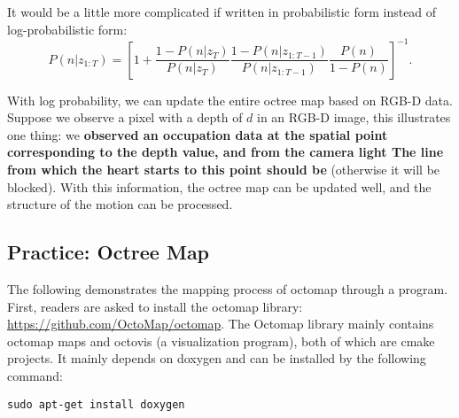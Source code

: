 It would be a little more complicated if written in probabilistic form instead of log-probabilistic form:
\begin{equation}
P (n | z_{1: T})=\left[1+ \frac{1-P (n | z_T)}{P (n | z_T)} \frac{1-P (n | z_{1: T-1})}{P (n | z_{1: T-1})} \frac{P (n)}{1-P (n)} \right] ^{-1}.
\end{equation}

With log probability, we can update the entire octree map based on RGB-D data. Suppose we observe a pixel with a depth of $ d $ in an RGB-D image, this illustrates one thing: we \textbf{observed an occupation data at the spatial point corresponding to the depth value, and from the camera light The line from which the heart starts to this point should be} (otherwise it will be blocked). With this information, the octree map can be updated well, and the structure of the motion can be processed.

\subsection{Practice: Octree Map}
The following demonstrates the mapping process of octomap through a program. First, readers are asked to install the octomap library: \url{https://github.com/OctoMap/octomap}. The Octomap library mainly contains octomap maps and octovis (a visualization program), both of which are cmake projects. It mainly depends on doxygen and can be installed by the following command:
\begin{lstlisting}
sudo apt-get install doxygen
\end{lstlisting}

